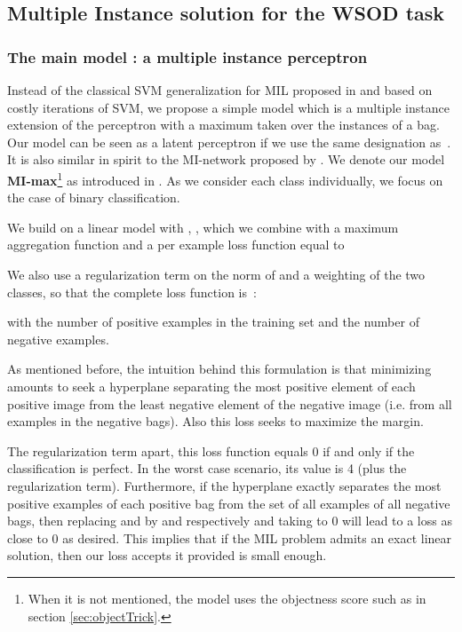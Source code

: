 \documentclass[preprint]{elsarticle}
\newcommand\MILS{MI-max}
\begin{document}
\subsection{Multiple Instance solution for the WSOD task}

\subsubsection{The main model : a multiple instance perceptron}
\label{sec:MainModel} 

Instead of the classical SVM generalization for MIL proposed in \cite{andrews_support_2003} and based on costly iterations of SVM, we propose a simple model which is a multiple instance extension of the perceptron  \cite{rosenblatt_perceptron_1958} with a maximum taken over the instances of a bag. Our model can be seen as a latent perceptron if we use the same designation as~\cite{felzenszwalb_object_2010}.
It is also similar in spirit to the MI-network proposed by \cite{zhou_neural_2002} . We denote our model {\bf \MILS{}}\footnote{When it is not mentioned, the model uses the objectness score such as in section \ref{sec:objectTrick}.} as introduced in \cite{gonthier_weakly_2018}. 
As we consider each class individually, we focus on the case of binary classification.

We build on a linear model  with , , which we combine with a maximum aggregation function  and a per example loss function equal to 

We also use a regularization term on the norm of  and a weighting of the two classes, so that the complete loss function is~: 


with  the number of positive examples in the training set and  the number of negative examples.

As mentioned before, the intuition behind this formulation is that minimizing  amounts to seek a hyperplane separating the most positive element of each positive image from the least negative element of the negative image (i.e. from all examples in the negative bags). Also this loss seeks to maximize the margin. 
 
 The regularization term apart, this loss function equals 0 if and only if the classification is perfect.  In the worst case scenario, its value is 4 (plus the regularization term). Furthermore, if the hyperplane   exactly separates the most positive examples of each positive bag from the set of all examples of all negative bags, then replacing  and  by  and  respectively and taking  to 0 will lead to a loss as close to 0 as desired. This implies that if the MIL problem admits an exact linear solution, then our loss accepts it provided  is small enough. 
\end{document}
